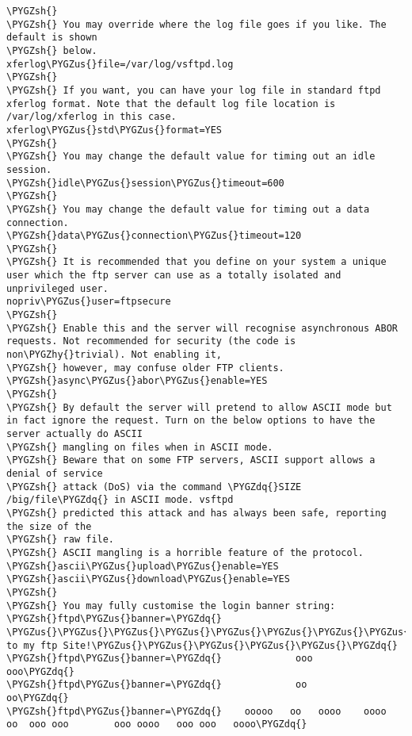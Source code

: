 \documentclass[letterpaper,10pt,english]{sphinxmanual}
\def\PYGZus{\char`\_}
\def\PYGZsh{\char`\#}
\def\PYGZhy{\char`\-}
\def\PYGZdq{\char`\"}
\begin{document}
\begin{Verbatim}[commandchars=\\\{\}]
\PYGZsh{}
\PYGZsh{} You may override where the log file goes if you like. The default is shown
\PYGZsh{} below.
xferlog\PYGZus{}file=/var/log/vsftpd.log
\PYGZsh{}
\PYGZsh{} If you want, you can have your log file in standard ftpd xferlog format. Note that the default log file location is /var/log/xferlog in this case.
xferlog\PYGZus{}std\PYGZus{}format=YES
\PYGZsh{}
\PYGZsh{} You may change the default value for timing out an idle session.
\PYGZsh{}idle\PYGZus{}session\PYGZus{}timeout=600
\PYGZsh{}
\PYGZsh{} You may change the default value for timing out a data connection.
\PYGZsh{}data\PYGZus{}connection\PYGZus{}timeout=120
\PYGZsh{}
\PYGZsh{} It is recommended that you define on your system a unique user which the ftp server can use as a totally isolated and unprivileged user.
nopriv\PYGZus{}user=ftpsecure
\PYGZsh{}
\PYGZsh{} Enable this and the server will recognise asynchronous ABOR requests. Not recommended for security (the code is non\PYGZhy{}trivial). Not enabling it,
\PYGZsh{} however, may confuse older FTP clients.
\PYGZsh{}async\PYGZus{}abor\PYGZus{}enable=YES
\PYGZsh{}
\PYGZsh{} By default the server will pretend to allow ASCII mode but in fact ignore the request. Turn on the below options to have the server actually do ASCII
\PYGZsh{} mangling on files when in ASCII mode.
\PYGZsh{} Beware that on some FTP servers, ASCII support allows a denial of service
\PYGZsh{} attack (DoS) via the command \PYGZdq{}SIZE /big/file\PYGZdq{} in ASCII mode. vsftpd
\PYGZsh{} predicted this attack and has always been safe, reporting the size of the
\PYGZsh{} raw file.
\PYGZsh{} ASCII mangling is a horrible feature of the protocol.
\PYGZsh{}ascii\PYGZus{}upload\PYGZus{}enable=YES
\PYGZsh{}ascii\PYGZus{}download\PYGZus{}enable=YES
\PYGZsh{}
\PYGZsh{} You may fully customise the login banner string:
\PYGZsh{}ftpd\PYGZus{}banner=\PYGZdq{}      \PYGZus{}\PYGZus{}\PYGZus{}\PYGZus{}\PYGZus{}\PYGZus{}\PYGZus{}\PYGZus{}\PYGZus{}\PYGZus{}\PYGZus{}\PYGZus{}\PYGZus{}\PYGZus{}\PYGZus{}\PYGZus{}\PYGZus{}\PYGZus{}\PYGZus{}\PYGZus{}\PYGZus{}\PYGZus{}\PYGZus{}\PYGZus{}\PYGZus{}\PYGZus{}\PYGZus{}\PYGZus{}\PYGZus{}\PYGZus{}\PYGZus{}\PYGZus{}\PYGZus{}\PYGZus{}\PYGZus{}\PYGZus{}\PYGZus{}\PYGZus{}\PYGZus{}\PYGZus{}\PYGZus{}\PYGZus{}\PYGZus{}\PYGZus{}Welcome to my ftp Site!\PYGZus{}\PYGZus{}\PYGZus{}\PYGZus{}\PYGZus{}\PYGZdq{}
\PYGZsh{}ftpd\PYGZus{}banner=\PYGZdq{}             ooo                 ooo\PYGZdq{}
\PYGZsh{}ftpd\PYGZus{}banner=\PYGZdq{}             oo                  oo\PYGZdq{}
\PYGZsh{}ftpd\PYGZus{}banner=\PYGZdq{}    ooooo   oo   oooo    oooo   oo  ooo ooo        ooo oooo   ooo ooo   oooo\PYGZdq{}

\end{Verbatim}
\end{document}
